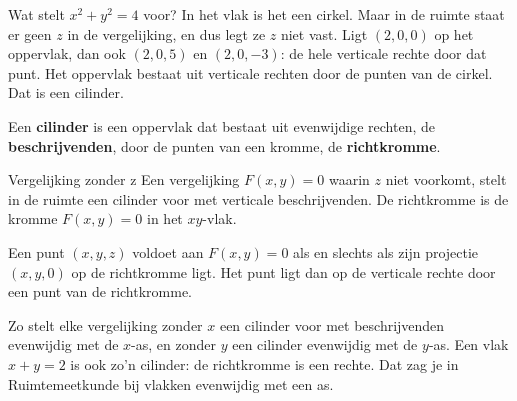 Wat stelt $x^2 + y^2 = 4$ voor? In het vlak is het een cirkel. Maar in de ruimte staat er geen $z$ in de vergelijking, en dus legt ze $z$ niet vast. Ligt $(2, 0, 0)$ op het oppervlak, dan ook $(2, 0, 5)$ en $(2, 0, -3)$: de hele verticale rechte door dat punt. Het oppervlak bestaat uit verticale rechten door de punten van de cirkel. Dat is een cilinder.

\begin{theorie}
\begin{minipage}[t]{.68\linewidth}
\vspace{0pt}
Een \textbf{\textcolor{accent}{cilinder}} is een oppervlak dat bestaat uit evenwijdige rechten, de \textbf{\textcolor{accent}{beschrijvenden}}, door de punten van een kromme, de \textbf{\textcolor{accent}{richtkromme}}.

\begin{stelling}{Vergelijking zonder z}
Een vergelijking $F(x, y) = 0$ waarin $z$ niet voorkomt, stelt in de ruimte een cilinder voor met verticale beschrijvenden. De richtkromme is de kromme $F(x, y) = 0$ in het $xy$-vlak.
\end{stelling}
\end{minipage}\hfill
\begin{minipage}[t]{.28\linewidth}
\vspace{0pt}
\centering
{}
\end{minipage}

\begin{bewijs}
Een punt $(x, y, z)$ voldoet aan $F(x, y) = 0$ als en slechts als zijn projectie $(x, y, 0)$ op de richtkromme ligt. Het punt ligt dan op de verticale rechte door een punt van de richtkromme.
\end{bewijs}
\end{theorie}

Zo stelt elke vergelijking zonder $x$ een cilinder voor met beschrijvenden evenwijdig met de $x$-as, en zonder $y$ een cilinder evenwijdig met de $y$-as. Een vlak $x + y = 2$ is ook zo'n cilinder: de richtkromme is een rechte. Dat zag je in Ruimtemeetkunde bij vlakken evenwijdig met een as.

